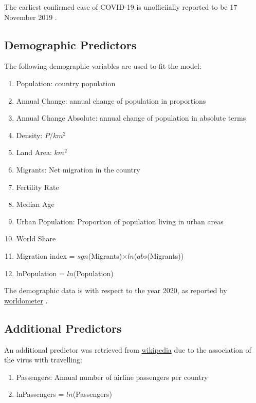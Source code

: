 \documentclass[]{report}
\begin{document}
The earliest confirmed case  of COVID-19 is  unofficiially reported to be 17 November 2019 \cite{scmp}.

\subsection{Demographic Predictors}
The following demographic variables are used to fit the model:

\begin{enumerate}
	\item Population: country population
	\item Annual Change: annual change of population in proportions
	\item Annual Change Absolute: annual change of population in absolute terms 
	\item Density: $P/km^2$
	\item Land Area: $km^2$
	\item Migrants: Net migration in the country
	\item Fertility Rate
	\item Median Age
	\item Urban Population: Proportion of population living in urban areas
	\item World Share
	\item Migration index =  $sgn$(Migrants)$\times ln$($abs$(Migrants))
	\item lnPopulation = $ln$(Population)
\end{enumerate}

The demographic data is with respect to the year 2020, as reported by \href{https://www.worldometers.info/world-population/population-by-country/}{worldometer} \cite{worldometer}.

\subsection{Additional Predictors}

An additional predictor was retrieved from  \href{https://en.wikipedia.org/wiki/List_of_countries_by_airline_passengers}{wikipedia} \cite{wikipedia} due to the association of the virus with travelling:

\begin{enumerate}
	
	\item Passengers: Annual number of airline passengers per country
	
	\item lnPassengers = $ln$(Passengers)
\end{enumerate}
\end{document}
